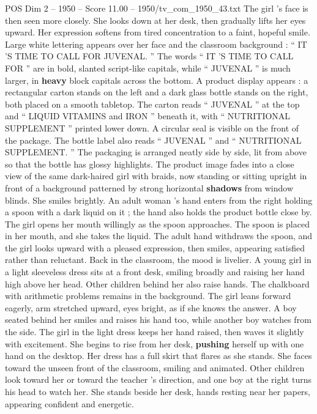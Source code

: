 \begin{textsample}{POS Dim 2 – 1950 – Score 11.00 – 1950/tv\_com\_1950\_43.txt}
The girl ’s face is then seen more closely.
She looks down at her desk, then gradually lifts her eyes upward.
Her expression softens from tired concentration to a faint, hopeful smile.
Large white lettering appears over her face and the classroom background : “ IT ’S TIME TO CALL FOR JUVENAL. ” The words “ IT ’S TIME TO CALL FOR ” are in bold, slanted script-like capitals, while “ JUVENAL ” is much larger, in \textbf{heavy} block capitals across the bottom.
A product display appears : a rectangular carton stands on the left and a dark glass bottle stands on the right, both placed on a smooth tabletop.
The carton reads “ JUVENAL ” at the top and “ LIQUID VITAMINS and IRON ” beneath it, with “ NUTRITIONAL SUPPLEMENT ” printed lower down.
A circular seal is visible on the front of the package.
The bottle label also reads “ JUVENAL ” and “ NUTRITIONAL SUPPLEMENT. ” The packaging is arranged neatly side by side, lit from above so that the bottle has glossy highlights.
The product image fades into a close view of the same dark-haired girl with braids, now standing or sitting upright in front of a background patterned by strong horizontal \textbf{shadows} from window blinds.
She smiles brightly.
An adult woman ’s hand enters from the right holding a spoon with a dark liquid on it ; the hand also holds the product bottle close by.
The girl opens her mouth willingly as the spoon approaches.
The spoon is placed in her mouth, and she takes the liquid.
The adult hand withdraws the spoon, and the girl looks upward with a pleased expression, then smiles, appearing satisfied rather than reluctant.
Back in the classroom, the mood is livelier.
A young girl in a light sleeveless dress sits at a front desk, smiling broadly and raising her hand high above her head.
Other children behind her also raise hands.
The chalkboard with arithmetic problems remains in the background.
The girl leans forward eagerly, arm stretched upward, eyes bright, as if she knows the answer.
A boy seated behind her smiles and raises his hand too, while another boy watches from the side.
The girl in the light dress keeps her hand raised, then waves it slightly with excitement.
She begins to rise from her desk, \textbf{pushing} herself up with one hand on the desktop.
Her dress has a full skirt that flares as she stands.
She faces toward the unseen front of the classroom, smiling and animated.
Other children look toward her or toward the teacher ’s direction, and one boy at the right turns his head to watch her.
She stands beside her desk, hands resting near her papers, appearing confident and energetic.

\end{textsample}
